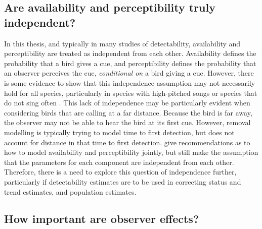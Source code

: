 \subsection{Are availability and perceptibility truly independent?}

\par In this thesis, and typically in many studies of detectability, availability and perceptibility are treated as independent from each other.
Availability defines the probability that a bird gives a cue, and perceptibility defines the probability that an observer perceives the cue, \textit{conditional on} a bird giving a cue.
However, there is some evidence to show that this independence assumption may not necessarily hold for all species, particularly in species with high-pitched songs or species that do not sing often \citep{martin-schwarze_joint_2021}.
This lack of independence may be particularly evident when considering birds that are calling at a far distance.
Because the bird is far away, the observer may not be able to hear the bird at its first cue.
However, removal modelling is typically trying to model time to first detection, but does not account for distance in that time to first detection.
\citep{solymos_calibrating_2013} give recommendations as to how to model availability and perceptibility jointly, but still make the assumption that the parameters for each component are independent from each other.
Therefore, there is a need to explore this question of independence further, particularly if detectability estimates are to be used in correcting status and trend estimates, and population estimates.

\subsection{How important are observer effects?}

